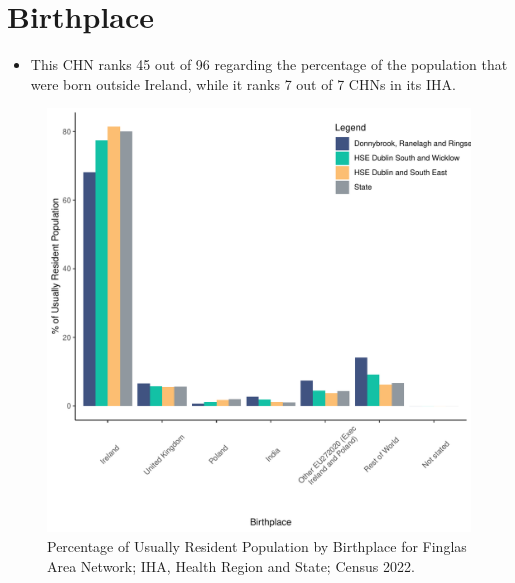 \documentclass{article}
\begin{document}
\section{Birthplace}\label{sect:Birth}
\begin{itemize}
\item This CHN ranks  45 out of 96 regarding the percentage of the population that were born outside Ireland, while it ranks  7 out of 7 CHNs in its IHA.
\end{itemize}
\begin{figure}[H]
	\centering
	\includegraphics[width = 130mm]{../figures/BirthED.pdf}
	\caption{Percentage of Usually Resident Population by Birthplace for Finglas Area Network; IHA, Health Region and State; Census 2022.}
	\label{fig:vbnv}
	\end{figure}
	
\end{document}
